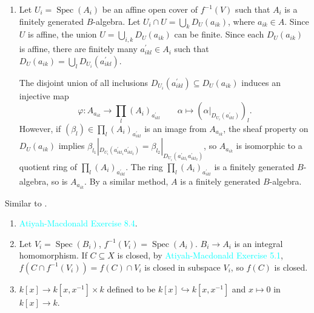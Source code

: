 \begin{exercise}\label{ex3.3}
	\begin{enumerate}[label=(\alph*),ref=\theexercise(\alph*)]
		\addtocounter{enumi}{2}
		\item\label{ex3.3.3} Let $U_i=\operatorname{Spec}\!\left(A_i\right)$ be an affine open cover of $f^{-1}(V)$ such that $A_i$ is a finitely generated $B$-algebra. Let $U_i\cap U=\bigcup_kD_U\!\left(a_{ik}\right)$, where $a_{ik}\in A$. Since $U$ is affine, the union $U=\bigcup_{i,k}D_U\!\left(a_{ik}\right)$ can be finite. Since each $D_U\!\left(a_{ik}\right)$ is affine, there are finitely many $a_{ikl}^\prime\in A_i$ such that $D_U\!\left(a_{ik}\right)=\bigcup_lD_{U_i}\!\left(a_{ikl}^\prime\right)$.
		
		The disjoint union of all inclusions $D_{U_i}\!\left(a_{ikl}^\prime\right)\subseteq D_U\!\left(a_{ik}\right)$ induces an injective map
		\begin{equation*}
			\varphi:A_{a_{ik}}\rightarrow\prod_l\left(A_i\right)_{a_{ikl}^\prime}\qquad \alpha\mapsto\left(\alpha|_{D_{U_i}\!\left(a_{ikl}^\prime\right)}\right)_l.
		\end{equation*}		
		However, if $\left(\beta_l\right)\in\prod_l\left(A_i\right)_{a_{ikl}^\prime}$ is an image from $A_{a_{ik}}$, the sheaf property on $D_U\!\left(a_{ik}\right)$ implies $\beta_{l_1}|_{D_{U_i}\!\left(a_{ikl_1}^\prime a_{ikl_2}^\prime\right)}=\beta_{l_2}|_{D_{U_i}\!\left(a_{ikl_1}^\prime a_{ikl_2}^\prime\right)}$, so $A_{a_{ik}}$ is isomorphic to a quotient ring of $\prod_l\left(A_i\right)_{a_{ikl}^\prime}$. The ring $\prod_l\left(A_i\right)_{a_{ikl}^\prime}$ is a finitely generated $B$-algebra, so is $A_{a_{ik}}$. By a similar method, $A$ is a finitely generated $B$-algebra.
	\end{enumerate}
\end{exercise}

\begin{exercise}\label{ex3.4}
	Similar to .
\end{exercise}

\begin{exercise}\label{ex3.5}
	\begin{enumerate}[label=(\alph*),ref=\theexercise(\alph*)]
		\item \textcolor{cyan}{Atiyah-Macdonald Exercise 8.4}.
		\item Let $V_i=\operatorname{Spec}\!\left(B_i\right)$, $f^{-1}\!\left(V_i\right)=\operatorname{Spec}\!\left(A_i\right)$. $B_i\rightarrow A_i$ is an integral homomorphism. If $C\subseteq X$ is closed, by \textcolor{cyan}{Atiyah-Macdonald Exercise 5.1}, $f\!\left(C\cap f^{-1}\!\left(V_i\right)\right)=f(C)\cap V_i$ is closed in subspace $V_i$, so $f(C)$ is closed.
		\item $k[x]\rightarrow k\!\left[x,x^{-1}\right]\times k$ defined to be $k[x]\hookrightarrow k\!\left[x,x^{-1}\right]$ and $x\mapsto0$ in $k[x]\rightarrow k$.
	\end{enumerate}
\end{exercise}

